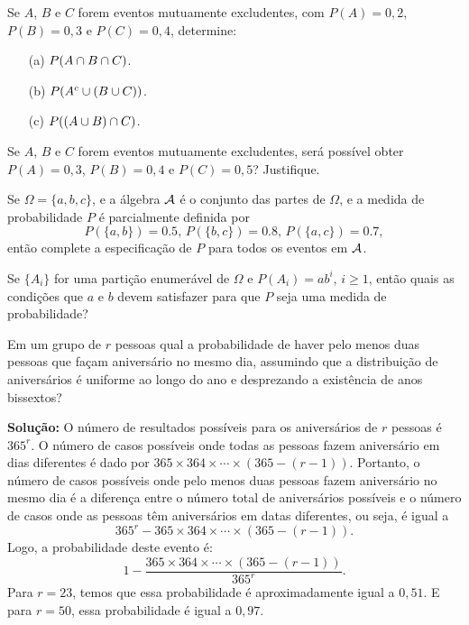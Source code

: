 \begin{frame}
\vspace{-0.3cm}
\begin{exer}
		Se $A$, $B$ e $C$ forem eventos mutuamente excludentes, com $P(A)=0{,}2$, $P(B)=0{,}3$ e $P(C)=0{,}4$, determine:
		\begin{enumerate}
			\item[(a)] $P(A\cap B\cap C)$.
			\item[(b)] $P(A^c\cup(B\cup C))$.
			\item[(c)] $P((A\cup B)\cap C)$.
		\end{enumerate}
		
	\end{exer}
	
	\begin{exer}
		Se $A$, $B$ e $C$ forem eventos mutuamente excludentes, será possível obter $P(A)=0{,}3$, $P(B)=0{,}4$ e $P(C)=0{,}5$? Justifique.
	\end{exer}

\begin{exer}
Se $\Omega=\{a,b,c\}$, e a álgebra ${\cal A}$ é o conjunto das partes de
$\Omega$, e a medida de probabilidade $P$ é parcialmente definida
por
$$P(\{a,b\})=0.5\mbox{,  }P(\{b,c\})=0.8\mbox{,  }P(\{a,c\})=0.7,$$
então complete a especificação de $P$ para todos os eventos em ${\cal A}$.
\end{exer}

\begin{exer}
Se $\{A_i\}$ for uma partição enumerável de $\Omega$ e
$P(A_i)=ab^i$, $i\geq 1$, então quais as condições que $a$ e $b$
devem satisfazer para que $P$ seja uma medida de probabilidade?
\end{exer}

\end{frame}

\begin{frame}

\begin{exem}
Em um grupo de $r$ pessoas qual a probabilidade de haver pelo menos
duas pessoas que façam aniversário no mesmo dia, assumindo que a
distribuição de aniversários é uniforme ao longo do ano e
desprezando a existência de anos bissextos?
\end{exem}

{\bf Solução:} O número de resultados possíveis para os
aniversários de $r$ pessoas é $365^r$. O número de casos possíveis
onde todas as pessoas fazem aniversário em dias diferentes é dado
por $365\times 364\times \cdots\times(365-(r-1))$. Portanto, o
número de casos possíveis onde pelo menos duas pessoas fazem
aniversário no mesmo dia é a diferença entre o número total de
aniversários possíveis e o número de casos onde as pessoas têm
aniversários em datas diferentes, ou seja, é igual a
$$365^r-365\times 364\times \cdots\times(365-(r-1)).$$
Logo, a probabilidade deste evento é:
$$1-\frac{365\times 364\times \cdots\times(365-(r-1))}{365^r}.$$
Para $r=23$, temos que essa probabilidade é aproximadamente igual a
$0,51$. E para $r=50$, essa probabilidade é igual a $0,97$.

\end{frame}


